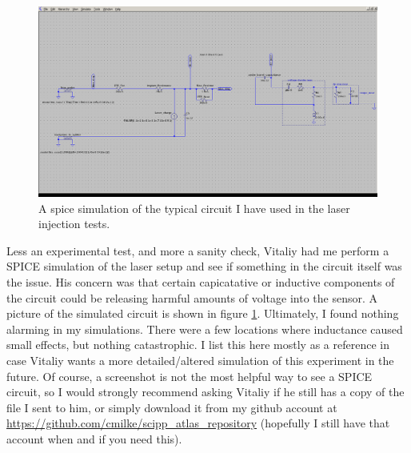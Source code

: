 \documentclass{report}
\begin{document}
            \begin{figure}[h] 
                \includegraphics[height=.4\textheight]{spice_circuit}
                \centering
                \caption{ A spice simulation of the typical circuit I have used in the laser injection tests. }
                \label{fig:spice_circuit}
            \end{figure}

            Less an experimental test, and more a sanity check, Vitaliy had me perform a SPICE simulation of the laser setup and see if something in the circuit itself was the issue. His concern was that certain capicatative or inductive components of the circuit could be releasing harmful amounts of voltage into the sensor. A picture of the simulated circuit is shown in figure \ref{fig:spice_circuit}. Ultimately, I found nothing alarming in my simulations. There were a few locations where inductance caused small effects, but nothing catastrophic. I list this here mostly as a reference in case Vitaliy wants a more detailed/altered simulation of this experiment in the future. Of course, a screenshot is not the most helpful way to see a SPICE circuit, so I would strongly recommend asking Vitaliy if he still has a copy of the file I sent to him, or simply download it from my github account at \url{https://github.com/cmilke/scipp\_atlas\_repository} (hopefully I still have that account when and if you need this).
\end{document}
